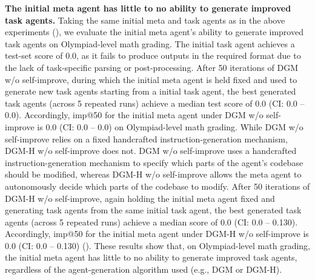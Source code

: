 \documentclass[]{fairmeta}
\begin{document}
\textbf{The initial meta agent has little to no ability to generate improved task agents.}
Taking the same initial meta and task agents as in the above experiments (), we evaluate the initial meta agent's ability to generate improved task agents on Olympiad-level math grading. The initial task agent achieves a test-set score of 0.0, as it fails to produce outputs in the required format due to the lack of task-specific parsing or post-processing.
After 50 iterations of DGM w/o self-improve, during which the initial meta agent is held fixed and used to generate new task agents starting from a initial task agent, the best generated task agents (across 5 repeated runs) achieve a median test score of 0.0 (CI: 0.0 – 0.0). Accordingly, imp@50 for the initial meta agent under DGM w/o self-improve is 0.0 (CI: 0.0 – 0.0) on Olympiad-level math grading.
While DGM w/o self-improve relies on a fixed handcrafted instruction-generation mechanism, DGM-H w/o self-improve does not. DGM w/o self-improve uses a handcrafted instruction-generation mechanism to specify which parts of the agent's codebase should be modified, whereas DGM-H w/o self-improve allows the meta agent to autonomously decide which parts of the codebase to modify.
After 50 iterations of DGM-H w/o self-improve, again holding the initial meta agent fixed and generating task agents from the same initial task agent, the best generated task agents (across 5 repeated runs) achieve a median score of 0.0 (CI: 0.0 – 0.130). Accordingly, imp@50 for the initial meta agent under DGM-H w/o self-improve is 0.0 (CI: 0.0 – 0.130) ().
These results show that, on Olympiad-level math grading, the initial meta agent has little to no ability to generate improved task agents, regardless of the agent-generation algorithm used (e.g., DGM or DGM-H).
\end{document}
